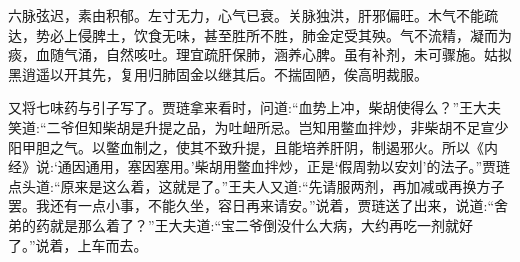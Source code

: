 \begin{qute2sp}
    六脉弦迟，素由积郁。左寸无力，心气已衰。关脉独洪，肝邪偏旺。木气不能疏达，势必上侵脾土，饮食无味，甚至胜所不胜，肺金定受其殃。气不流精，凝而为痰，血随气涌，自然咳吐。理宜疏肝保肺，涵养心脾。虽有补剂，未可骤施。姑拟黑逍遥以开其先，复用归肺固金以继其后。不揣固陋，俟高明裁服。
\end{qute2sp}


\begin{parag}
    又将七味药与引子写了。贾琏拿来看时，问道:“血势上冲，柴胡使得么？”王大夫笑道:“二爷但知柴胡是升提之品，为吐衄所忌。岂知用鳖血拌炒，非柴胡不足宣少阳甲胆之气。以鳖血制之，使其不致升提，且能培养肝阴，制遏邪火。所以《内经》说:‘通因通用，塞因塞用。’柴胡用鳖血拌炒，正是‘假周勃以安刘’的法子。”贾琏点头道:“原来是这么着，这就是了。”王夫人又道:“先请服两剂，再加减或再换方子罢。我还有一点小事，不能久坐，容日再来请安。”说着，贾琏送了出来，说道:“舍弟的药就是那么着了？”王大夫道:“宝二爷倒没什么大病，大约再吃一剂就好了。”说着，上车而去。
\end{parag}


